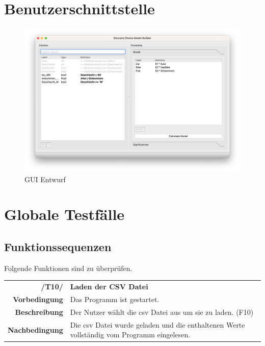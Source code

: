 \documentclass{article}
\begin{document}
\section{Benutzerschnittstelle}
\begin{figure}[H]%
  \centering
  \includegraphics[width=12cm]{specifications/img/gui-screenshots/columns+model.png}
  \caption{GUI Entwurf}
\end{figure}

\clearpage
\section{Globale Testfälle}

\subsection{Funktionssequenzen}
Folgende Funktionen sind zu überprüfen.

\begin{table}[H]
\begin{tabularx}{\textwidth}{rX}
\textbf{/T10/}         & \textbf{Laden der CSV Datei}                                                               \\
\textbf{Vorbedingung}  & Das Programm ist gestartet.                                                                \\
\textbf{Beschreibung}  & Der Nutzer wählt die csv Datei aus um sie zu laden. (F10)                                \\
\textbf{Nachbedingung} & Die csv Datei wurde geladen und die enthaltenen Werte vollständig vom Programm eingelesen.
\end{tabularx}
\end{table}
\end{document}
